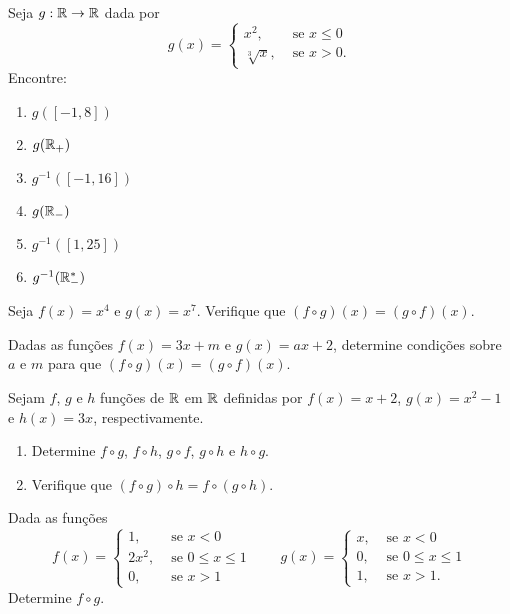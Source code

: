 \documentclass[12pt]{exam}
\begin{document}
\vspace{.3cm}

\questao{} Seja $g : \mathbb{R} \to \mathbb{R}$ dada por
\[
	g(x) = \begin{cases}
		x^2,& \mbox{ se } x \le 0\\
		\sqrt[3]{x}, & \mbox{ se } x > 0.
	\end{cases}
\]
Encontre:
\begin{multicols}{2}
	\begin{enumerate}[label={\alph*})]
		\item $g([-1,8])$
		\item $g(\mathbb{R}_+)$
		\item $g^{-1}([-1,16])$
		\item $g(\mathbb{R}_-)$
		\item $g^{-1}([1,25])$
		\item $g^{-1}(\mathbb{R}^*_-)$
	\end{enumerate}	
\end{multicols}


\vspace{.3cm}

\questao{} Seja $f(x) = x^4$ e $g(x) = x^7$. Verifique que $(f\circ g)(x) = (g\circ f)(x)$.

\vspace{.3cm}

\questao{} Dadas as fun\c{c}\~oes $f(x) = 3x + m$ e $g(x) = ax + 2$, determine condi\c{c}\~oes sobre $a$ e $m$ para que $(f\circ g)(x) = (g\circ f)(x)$.

\newpage

\questao{} Sejam $f$, $g$ e $h$ fun\c{c}\~oes de $\mathbb{R}$ em $\mathbb{R}$ definidas por $f(x) = x + 2$, $g(x) = x^2 - 1$ e $h(x) = 3x$, respectivamente.
\begin{enumerate}[label={\alph*})]
	\item Determine $f \circ g$, $f \circ h$, $g \circ f$, $g \circ h$ e $h \circ g$.
	\item Verifique que $(f \circ g)\circ h = f \circ (g \circ h)$.
\end{enumerate}

\vspace{.3cm}

\questao{} Dada as fun\c{c}\~oes
\[
	f(x) = \begin{cases}
		1, & \mbox{ se } x < 0\\
		2x^2, & \mbox{ se } 0 \le x \le 1\\
		0, & \mbox{ se } x > 1
	\end{cases} \qquad g(x) = \begin{cases}
		x, & \mbox{ se } x < 0\\
		0, & \mbox{ se } 0 \le x \le 1\\
		1, & \mbox{ se } x > 1.
	\end{cases}
\]
Determine $f\circ g$.
\end{document}
